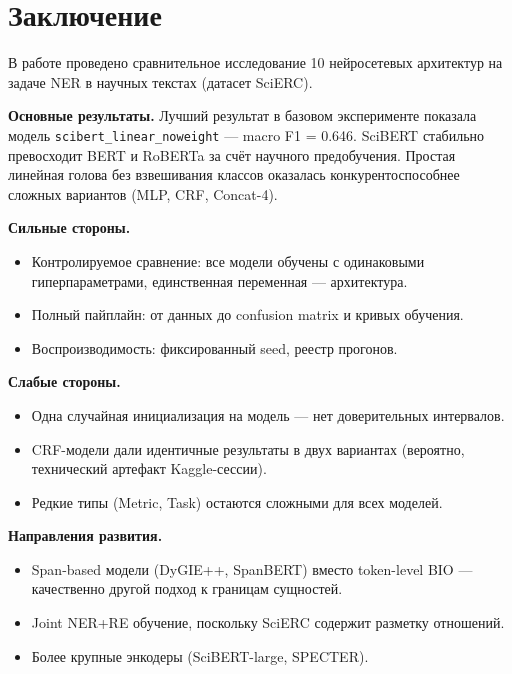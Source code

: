 \section*{Заключение}

В работе проведено сравнительное исследование 10 нейросетевых архитектур на задаче NER в научных текстах (датасет SciERC).

\textbf{Основные результаты.} Лучший результат в базовом эксперименте показала модель \texttt{scibert\_linear\_noweight} --- macro F1 = 0.646. SciBERT стабильно превосходит BERT и RoBERTa за счёт научного предобучения. Простая линейная голова без взвешивания классов оказалась конкурентоспособнее сложных вариантов (MLP, CRF, Concat-4).

\textbf{Сильные стороны.}
\begin{itemize}
    \item Контролируемое сравнение: все модели обучены с одинаковыми гиперпараметрами, единственная переменная --- архитектура.
    \item Полный пайплайн: от данных до confusion matrix и кривых обучения.
    \item Воспроизводимость: фиксированный seed, реестр прогонов.
\end{itemize}

\textbf{Слабые стороны.}
\begin{itemize}
    \item Одна случайная инициализация на модель --- нет доверительных интервалов.
    \item CRF-модели дали идентичные результаты в двух вариантах (вероятно, технический артефакт Kaggle-сессии).
    \item Редкие типы (Metric, Task) остаются сложными для всех моделей.
\end{itemize}

\textbf{Направления развития.}
\begin{itemize}
    \item Span-based модели (DyGIE++, SpanBERT) вместо token-level BIO --- качественно другой подход к границам сущностей.
    \item Joint NER+RE обучение, поскольку SciERC содержит разметку отношений.
    \item Более крупные энкодеры (SciBERT-large, SPECTER).
\end{itemize}
